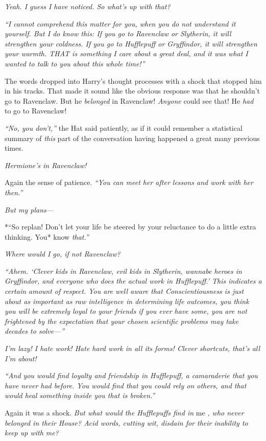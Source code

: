 \emph{Yeah. I guess I have noticed. So what's up with that?}

\emph{``I cannot comprehend this matter for you, when you do not
understand it yourself. But I do know this: If you go to Ravenclaw or
Slytherin, it will strengthen your coldness. If you go to Hufflepuff or
Gryffindor, it will strengthen your warmth. THAT is something I care
about a great deal, and it was what I wanted to talk to you about this
whole time!''}

The words dropped into Harry's thought processes with a shock that
stopped him in his tracks. That made it sound like the obvious response
was that he shouldn't go to Ravenclaw. But he \emph{belonged} in
Ravenclaw! \emph{Anyone} could see that! He \emph{had} to go to
Ravenclaw!

\emph{``No, you don't,''} the Hat said patiently, as if it could
remember a statistical summary of \emph{this} part of the conversation
having happened a great many previous times.

\emph{Hermione's in Ravenclaw!}

Again the sense of patience. \emph{``You can meet her after lessons and
work with her then.''}

\emph{But my plans---}

*``So replan! Don't let your life be steered by your reluctance to do a
little extra thinking. You* know \emph{that.''}

\emph{Where would I go, if not Ravenclaw?}

\emph{``Ahem. `Clever kids in Ravenclaw, evil kids in Slytherin, wannabe
heroes in Gryffindor, and everyone who does the actual work in
Hufflepuff.' This indicates a certain amount of respect. You are well
aware that Conscientiousness is just about as important as raw
intelligence in determining life outcomes, you think you will be
extremely loyal to your friends if you ever have some, you are not
frightened by the expectation that your chosen scientific problems may
take decades to solve---''}

\emph{I'm lazy! I hate work! Hate hard work in all its forms! Clever
shortcuts, that's all I'm about!}

\emph{``And you would find loyalty and friendship in Hufflepuff, a
camaraderie that you have never had before. You would find that you
could rely on others, and that would heal something inside you that is
broken.''}

Again it was a shock. \emph{But what would the Hufflepuffs find in} me
\emph{, who never belonged in their House? Acid words, cutting wit,
disdain for their inability to keep up with me?}

